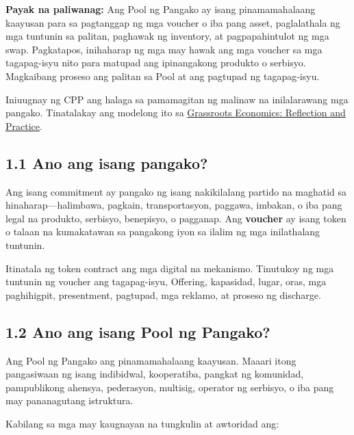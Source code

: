\documentclass[11pt]{article}
\begin{document}
\textbf{Payak na paliwanag:} Ang Pool ng Pangako ay isang pinamamahalaang kaayusan para sa pagtanggap ng mga voucher o iba pang asset, paglalathala ng mga tuntunin sa palitan, paghawak ng inventory, at pagpapahintulot ng mga swap. Pagkatapos, inihaharap ng mga may hawak ang mga voucher sa mga tagapag-isyu nito para matupad ang ipinangakong produkto o serbisyo. Magkaibang proseso ang palitan sa Pool at ang pagtupad ng tagapag-isyu.

Iniuugnay ng CPP ang halaga sa pamamagitan ng malinaw na inilalarawang mga pangako. Tinatalakay ang modelong ito sa \href{https://willruddick.substack.com/p/grassroots-economics-the-book-is}{Grassroots Economics: Reflection and Practice}.

\subsection*{1.1 Ano ang isang pangako?}

Ang isang commitment ay pangako ng isang nakikilalang partido na maghatid sa hinaharap---halimbawa, pagkain, transportasyon, paggawa, imbakan, o iba pang legal na produkto, serbisyo, benepisyo, o pagganap. Ang \textbf{voucher} ay isang token o talaan na kumakatawan sa pangakong iyon sa ilalim ng mga inilathalang tuntunin.

Itinatala ng token contract ang mga digital na mekanismo. Tinutukoy ng mga tuntunin ng voucher ang tagapag-isyu, Offering, kapasidad, lugar, oras, mga paghihigpit, presentment, pagtupad, mga reklamo, at proseso ng discharge.

\subsection*{1.2 Ano ang isang Pool ng Pangako?}

Ang Pool ng Pangako ang pinamamahalaang kaayusan. Maaari itong pangasiwaan ng isang indibidwal, kooperatiba, pangkat ng komunidad, pampublikong ahensya, pederasyon, multisig, operator ng serbisyo, o iba pang may pananagutang istruktura.

Kabilang sa mga may kaugnayan na tungkulin at awtoridad ang:
\end{document}
